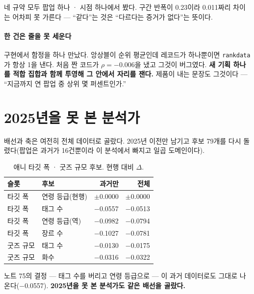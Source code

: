 \documentclass[10pt]{article}
\begin{document}
{네 규약 모두 팝업 하나 · 시점 하나에서 봤다. 구간 반폭이 0.23이라 0.011짜리
차이는 어차피 못 가른다 --- ``같다''는 것은 ``다르다는 증거가 없다''는 뜻이다.}

\paragraph{한 건은 줄을 못 세운다}
구현에서 함정을 하나 만났다. 앙상블이 순위 평균인데 레코드가 하나뿐이면
\texttt{rankdata} 가 항상 1을 낸다. 처음 짠 코드가 $\rho=-$0.006을 냈고 그것이
버그였다. \textbf{새 기획 하나를 적합 집합과 함께 투영해 그 안에서 자리를
잰다.} 제품이 내는 문장도 그것이다 --- ``지금까지 연 팝업 중 상위 몇 퍼센트인가.''

\section{2025년을 못 본 분석가}

배선과 축은 여전히 전체 데이터로 골랐다. 2025년 이전만 남기고 후보 79개를
다시 돌렸다(팝업은 과거가 16건뿐이라 이 분석에서 빠지고 일곱 도메인이다).

\begin{table}[t]
\centering\tsize
\caption{애니 타깃 폭 · 굿즈 규모 후보. 현행 대비 $\Delta$.}
\begin{tabular}{llrr}
\toprule
슬롯 & 후보 & 과거만 & 전체 \\
\midrule
타깃 폭 & 연령 등급(현행) & $\pm$0.0000 & $\pm$0.0000 \\
타깃 폭 & 태그 수 & $-$0.0557 & $-$0.0513 \\
타깃 폭 & 연령 등급(역) & $-$0.0982 & $-$0.0794 \\
타깃 폭 & 장르 수 & $-$0.1027 & $-$0.0781 \\
굿즈 규모 & 태그 수 & $-$0.0130 & $-$0.0175 \\
굿즈 규모 & 화수 & $-$0.0316 & $-$0.0322 \\
\bottomrule
\end{tabular}
\end{table}

노트 75의 결정 --- 태그 수를 버리고 연령 등급으로 --- 이 과거 데이터로도
그대로 나온다($-$0.0557). \textbf{2025년을 못 본 분석가도 같은 배선을 골랐다.}

\end{document}
